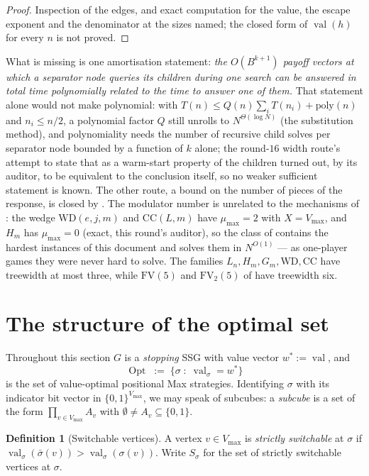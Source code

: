 \documentclass[11pt]{article}
\theoremstyle{plain}
\theoremstyle{definition}
\newtheorem{definition}[theorem]{Definition}
\DeclareMathOperator{\val}{val}
\DeclareMathOperator{\Opt}{Opt}
\newcommand{\Vmax}{V_{\max}}
\begin{document}
\begin{proof}
Inspection of the edges, and exact computation for the value, the escape
exponent and the denominator at the sizes named; the closed form of
$\val(h)$ for every $n$ is not proved.
\end{proof}

What is missing is one amortisation statement: \emph{the $O(B^{k+1})$
payoff vectors at which a separator node queries its children during one
search can be answered in total time polynomially related to the time to
answer one of them.} That statement alone would not make 
polynomial: with $T(n)\le Q(n)\sum_iT(n_i)+\mathrm{poly}(n)$ and
$n_i\le n/2$, a polynomial factor $Q$ still unrolls to
$N^{\Theta(\log N)}$ (the substitution method), and polynomiality needs
the number of recursive child solves per separator node bounded by a
function of $k$ alone; the round-$16$ width route's attempt to state that
as a warm-start property of the children turned out, by its auditor, to
be equivalent to the conclusion itself, so no weaker sufficient statement
is known. The other route, a bound on the number of pieces of the
response, is closed by . The modulator number is
unrelated to the mechanisms of : the wedge
$\mathrm{WD}(e,j,m)$ and $\mathrm{CC}(L,m)$ have $\mu_{\max}=2$ with
$X=\Vmax$, and $H_m$ has $\mu_{\max}=0$ (exact, this round's auditor), so
the class of  contains the hardest instances of this
document and solves them in $N^{O(1)}$ --- as one-player games they were
never hard to solve. The families $L_n,H_m,G_m,\mathrm{WD},\mathrm{CC}$
have treewidth at most three, while $\mathrm{FV}(5)$ and $\mathrm{FV}_2(5)$
of  have treewidth six.

\section{The structure of the optimal set}\label{sec:structure}

Throughout this section $G$ is a \emph{stopping} SSG with value vector
$w^\ast:=\val$, and
\[
  \Opt \;:=\;\bigl\{\sigma \;:\; \val_\sigma = w^\ast\bigr\}
\]
is the set of value-optimal positional Max strategies. Identifying
$\sigma$ with its indicator bit vector in $\{0,1\}^{\Vmax}$, we may speak
of subcubes: a \emph{subcube} is a set of the form
$\prod_{v\in\Vmax}A_v$ with $\emptyset\ne A_v\subseteq\{0,1\}$.

\begin{definition}[Switchable vertices]\label{def:switchable}
A vertex $v\in\Vmax$ is \emph{strictly switchable} at $\sigma$ if
$\val_\sigma(\bar\sigma(v))>\val_\sigma(\sigma(v))$. Write $S_\sigma$ for
the set of strictly switchable vertices at $\sigma$.
\end{definition}
\end{document}
